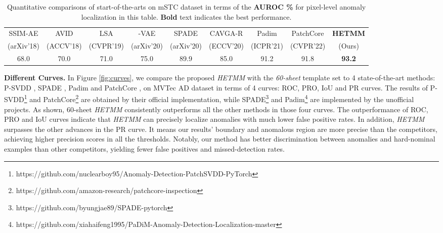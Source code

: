\documentclass[default,iicol]{sn-jnl}\usepackage[algo2e,ruled,linesnumbered]{algorithm2e}
\theoremstyle{thmstyleone}\newtheorem{theorem}{Theorem}\newtheorem{proposition}[theorem]{Proposition}
\theoremstyle{thmstyletwo}\newtheorem{example}{Example}\newtheorem{remark}{Remark}
\theoremstyle{thmstylethree}\newtheorem{definition}{Definition}
\begin{document}
\begin{table*}[!t]
    \caption{
    Quantitative comparisons of start-of-the-arts on mSTC dataset in terms of the \textbf{AUROC \%} for pixel-level anomaly localization in this table. 
    \textbf{Bold} text indicates the best performance.
    }
    \centering
    \tiny
\begin{tabular}{ccccccccc}
    \hline
    SSIM-AE\cite{SSIM-AE} &AVID\cite{AVID}      &LSA\cite{LSA}       &-VAE\cite{yVAEg} &SPADE\cite{SPADE}      &CAVGA-R\cite{CAVGA-R}   &Padim\cite{Padim}     &PatchCore\cite{patchcore} &\textbf{HETMM}\\
    (arXiv'18)  &(ACCV'18) &(CVPR'19) &(arXiv'20)         &(arXiv'20) &(ECCV'20) &(ICPR'21) &(CVPR'22) &(Ours)  \\\hline
    68.0        &70.0      &71.0      &75.0               &89.9       &85.0      &91.2      &91.8      &\textbf{93.2}  \\\hline
    \end{tabular}
    \label{table:mSTC}
\end{table*}

\noindent\textbf{Different Curves. }
In Figure \ref{fig:curves}, we compare the proposed \textit{HETMM} with the \textit{60-sheet} template set to 4 state-of-the-art methods: P-SVDD \cite{psvdd}, SPADE \cite{SPADE}, Padim \cite{Padim} and PatchCore \cite{patchcore}, on MVTec AD dataset in terms of 4 curves: ROC, PRO, IoU and PR curves.
The results of P-SVDD\footnote{https://github.com/nuclearboy95/Anomaly-Detection-PatchSVDD-PyTorch} and PatchCore\footnote{https://github.com/amazon-research/patchcore-inspection} are obtained by their official implementation, while SPADE\footnote{https://github.com/byungjae89/SPADE-pytorch} and Padim\footnote{https://github.com/xiahaifeng1995/PaDiM-Anomaly-Detection-Localization-master} are implemented by the unofficial projects.
As shown, 60-sheet \textit{HETMM} consistently outperforms all the other methods in those four curves.
The outperformance of ROC, PRO and IoU curves indicate that \textit{HETMM} can precisely localize anomalies with much lower false positive rates.
In addition, \textit{HETMM} surpasses the other advances in the PR curve.
It means our results' boundary and anomalous region are more precise than the competitors, achieving higher precision scores in all the thresholds.
Notably, our method has better discrimination between anomalies and hard-nominal examples than other competitors, yielding fewer false positives and missed-detection rates.
\end{document}
